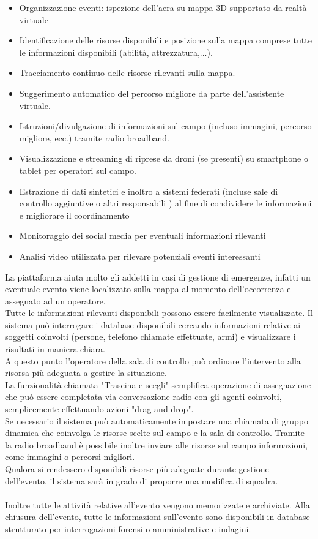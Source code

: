 \begin{itemize}
    \item Organizzazione eventi: ispezione dell'aera su mappa 3D
    supportato da realtà virtuale
    \item Identificazione delle risorse disponibili e posizione sulla mappa
    comprese tutte le informazioni disponibili (abilità, attrezzatura,...).
    \item Tracciamento continuo delle risorse rilevanti sulla mappa.
    \item Suggerimento automatico del percorso migliore da parte dell'assistente virtuale.
    \item Istruzioni/divulgazione di informazioni sul campo (incluso
    immagini, percorso migliore, ecc.) tramite radio broadband.
    \item Visualizzazione e streaming di riprese da droni (se presenti) su
    smartphone o tablet per operatori sul campo.
    \item Estrazione di dati sintetici e inoltro a sistemi federati
    (incluse sale di controllo aggiuntive o altri responsabili )
    al fine di condividere le informazioni e migliorare il coordinamento
    \item Monitoraggio dei social media per eventuali informazioni rilevanti
    \item Analisi video utilizzata per rilevare potenziali eventi interessanti
\end{itemize}
\pagebreak

La piattaforma aiuta molto gli addetti in casi di gestione di emergenze, infatti un eventuale
evento viene localizzato sulla mappa al momento dell'occorrenza e assegnato ad un operatore.\\
Tutte le informazioni rilevanti disponibili possono essere facilmente visualizzate. 
Il sistema può interrogare i database disponibili cercando
informazioni relative ai soggetti coinvolti (persone, telefono
chiamate effettuate, armi) e visualizzare i risultati in maniera chiara.\\
A questo punto l'operatore della sala di controllo può ordinare l'intervento alla 
risorsa  più adeguata a gestire la situazione. 
\\La funzionalità chiamata "Trascina e scegli" semplifica
operazione di assegnazione che può essere completata via conversazione radio 
con gli agenti coinvolti, semplicemente effettuando azioni "drag and drop".\\
Se necessario il sistema può automaticamente impostare una chiamata di gruppo dinamica 
che coinvolga le risorse scelte sul campo e la sala di controllo. Tramite la radio broadband è possibile
inoltre inviare alle risorse sul campo informazioni, come immagini o percorsi migliori.
\\Qualora si rendessero disponibili risorse più adeguate durante
gestione dell'evento, il sistema sarà in grado di proporre una modifica di squadra.
\\\\
Inoltre tutte le attività relative all'evento vengono memorizzate e archiviate.
Alla chiusura dell'evento, tutte le informazioni sull'evento sono disponibili in
database strutturato per interrogazioni forensi o amministrative
e indagini.

